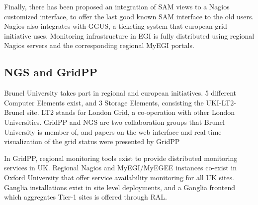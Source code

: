 Finally, there has been proposed an integration of SAM views to a Nagios customized interface, to offer the last good known SAM interface to the old users. Nagios also integrates with GGUS, a ticketing system that european grid initiative uses. Monitoring infrastructure in EGI is fully distributed using regional Nagios servers and the corresponding regional MyEGI portals.

\subsection{NGS and GridPP}
Brunel University takes part in regional and european initiatives. 5 different Computer Elements exist, and 3 Storage Elements, consisting the UKI-LT2-Brunel site. LT2 stands for London Grid, a co-operation with other London Universities. GridPP and NGS are two collaboration groups that Brunel University is member of, and papers on the web interface \cite{Hobson2007} and real time visualization of the grid status were presented \cite{Huang2007} by GridPP

In GridPP, regional monitoring tools exist to provide distributed monitoring services in UK. Regional Nagios and MyEGI/MyEGEE instances co-exist in Oxford University that offer service availability monitoring for all UK sites. Ganglia installations exist in site level deployments, and a Ganglia frontend which aggregates Tier-1 sites is offered through RAL.
